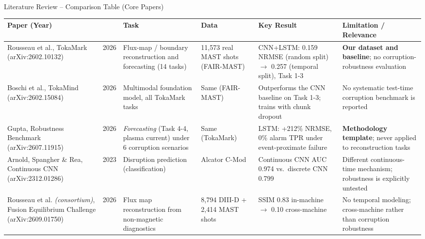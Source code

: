 \documentclass[aspectratio=169]{beamer}
\begin{document}
\begin{frame}{Literature Review -- Comparison Table (Core Papers)}
  \scriptsize
  \setlength{\tabcolsep}{2pt}
  \renewcommand{\arraystretch}{1.15}
  \begin{tabular}{P{2.1cm}P{0.45cm}P{2.2cm}P{2.2cm}P{2.4cm}P{2.6cm}}
    \toprule
    \textbf{Paper (Year)} & & \textbf{Task} & \textbf{Data} & \textbf{Key Result} & \textbf{Limitation / Relevance} \\
    \midrule
    Rousseau et al., TokaMark (arXiv:2602.10132) & 2026 &
      Flux-map / boundary reconstruction and forecasting (14 tasks) &
      11{,}573 real MAST shots (FAIR-MAST) &
      CNN+LSTM: 0.159 NRMSE (random split) $\to$ 0.257 (temporal split), Task 1-3 &
      \textbf{Our dataset and baseline}; no corruption-robustness evaluation \\
    \addlinespace
    Boschi et al., TokaMind (arXiv:2602.15084) & 2026 &
      Multimodal foundation model, all TokaMark tasks &
      Same (FAIR-MAST) &
      Outperforms the CNN baseline on Task 1-3; trains with chunk dropout &
      No systematic test-time corruption benchmark is reported \\
    \addlinespace
    Gupta, Robustness Benchmark (arXiv:2607.11915) & 2026 &
      \textit{Forecasting} (Task 4-4, plasma current) under 6 corruption scenarios &
      Same (TokaMark) &
      LSTM: +212\% NRMSE, 0\% alarm TPR under event-proximate failure &
      \textbf{Methodology template}; never applied to reconstruction tasks \\
    \addlinespace
    Arnold, Spangher \& Rea, Continuous CNN (arXiv:2312.01286) & 2023 &
      Disruption prediction (classification) &
      Alcator C-Mod &
      Continuous CNN AUC 0.974 vs.\ discrete CNN 0.799 &
      Different continuous-time mechanism; robustness is explicitly untested \\
    \addlinespace
    Rousseau et al. \textit{(consortium)}, Fusion Equilibrium Challenge (arXiv:2609.01750) & 2026 &
      Flux map reconstruction from non-magnetic diagnostics &
      8{,}794 DIII-D + 2{,}414 MAST shots &
      SSIM 0.83 in-machine $\to$ 0.10 cross-machine &
      No temporal modeling; cross-machine rather than corruption robustness \\
    \bottomrule
  \end{tabular}
\end{frame}

\end{document}
